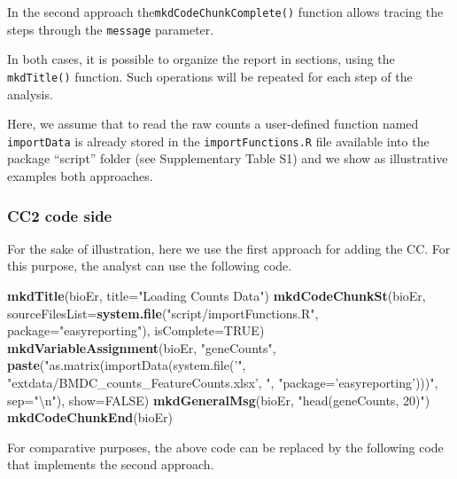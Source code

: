 \documentclass[]{article}
\newenvironment{Shaded}{\begin{snugshade}}{\end{snugshade}}
\newcommand{\CharTok}[1]{\textcolor[rgb]{0.31,0.60,0.02}{#1}}
\newcommand{\DataTypeTok}[1]{\textcolor[rgb]{0.13,0.29,0.53}{#1}}
\newcommand{\KeywordTok}[1]{\textcolor[rgb]{0.13,0.29,0.53}{\textbf{#1}}}
\newcommand{\NormalTok}[1]{#1}
\newcommand{\OtherTok}[1]{\textcolor[rgb]{0.56,0.35,0.01}{#1}}
\newcommand{\StringTok}[1]{\textcolor[rgb]{0.31,0.60,0.02}{#1}}
\begin{document}
In the second approach the\texttt{mkdCodeChunkComplete()} function
allows tracing the steps through the \texttt{message} parameter.

In both cases, it is possible to organize the report in sections, using
the \texttt{mkdTitle()} function. Such operations will be repeated for
each step of the analysis.

Here, we assume that to read the raw counts a user-defined function
named \texttt{importData} is already stored in the
\texttt{importFunctions.R} file available into the package ``script''
folder (see Supplementary Table S1) and we show as illustrative examples
both approaches.

\hypertarget{cc2-code-side}{%
\subsubsection{CC2 code side}\label{cc2-code-side}}

For the sake of illustration, here we use the first approach for adding
the CC. For this purpose, the analyst can use the following code.

\begin{Shaded}
\begin{Highlighting}[]
\KeywordTok{mkdTitle}\NormalTok{(bioEr, }\DataTypeTok{title=}\StringTok{"Loading Counts Data"}\NormalTok{)}
\KeywordTok{mkdCodeChunkSt}\NormalTok{(bioEr, }\DataTypeTok{sourceFilesList=}\KeywordTok{system.file}\NormalTok{(}\StringTok{"script/importFunctions.R"}\NormalTok{, }
                                    \DataTypeTok{package=}\StringTok{"easyreporting"}\NormalTok{), }\DataTypeTok{isComplete=}\OtherTok{TRUE}\NormalTok{)}
\KeywordTok{mkdVariableAssignment}\NormalTok{(bioEr, }\StringTok{"geneCounts"}\NormalTok{, }\KeywordTok{paste}\NormalTok{(}\StringTok{"as.matrix(importData(system.file('"}\NormalTok{,}
                            \StringTok{"extdata/BMDC_counts_FeatureCounts.xlsx', "}\NormalTok{,}
                            \StringTok{"package='easyreporting')))"}\NormalTok{, }\DataTypeTok{sep=}\StringTok{"}\CharTok{\textbackslash{}n}\StringTok{"}\NormalTok{), }\DataTypeTok{show=}\OtherTok{FALSE}\NormalTok{)}
\KeywordTok{mkdGeneralMsg}\NormalTok{(bioEr, }\StringTok{"head(geneCounts, 20)"}\NormalTok{)}
\KeywordTok{mkdCodeChunkEnd}\NormalTok{(bioEr)}
\end{Highlighting}
\end{Shaded}

For comparative purposes, the above code can be replaced by the
following code that implements the second approach.
\end{document}
